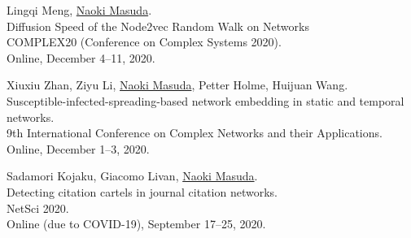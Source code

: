 \documentclass[11pt,letter]{article}
\begin{document}
\begin{etaremune}
\item Lingqi Meng, \underline{Naoki Masuda}.\\
Diffusion Speed of the Node2vec Random Walk on Networks\\
COMPLEX20 (Conference on Complex Systems 2020).\\
Online, December 4--11, 2020.
% 

\item Xiuxiu Zhan, Ziyu Li, \underline{Naoki Masuda}, Petter Holme, Huijuan Wang.\\
Susceptible-infected-spreading-based network embedding in static and temporal networks.\\
9th International Conference on Complex Networks and their Applications.\\
Online, December 1--3, 2020.



\item Sadamori Kojaku, Giacomo Livan, \underline{Naoki Masuda}.\\
Detecting citation cartels in journal citation networks.\\
NetSci 2020.\\
Online (due to COVID-19), September 17--25, 2020.


\end{etaremune}
\end{document}
